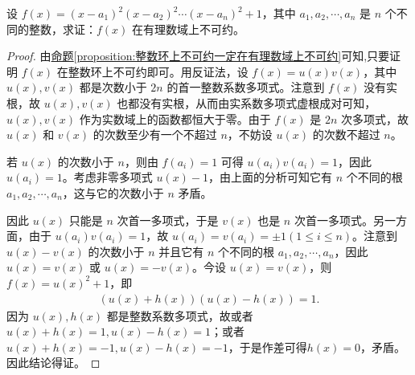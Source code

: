 \documentclass[../../main.tex]{subfiles}
\begin{document}
\begin{example}
设 $f(x) = (x - a_1)^2(x - a_2)^2 \cdots (x - a_n)^2 + 1$，其中 $a_1, a_2, \cdots, a_n$ 是 $n$ 个不同的整数，求证：$f(x)$ 在有理数域上不可约。
\end{example}
\begin{proof}
由\hyperref[proposition:整数环上不可约一定在有理数域上不可约]{命题\ref{proposition:整数环上不可约一定在有理数域上不可约}}可知,只要证明 $f(x)$ 在整数环上不可约即可。用反证法，设 $f(x) = u(x)v(x)$，其中 $u(x), v(x)$ 都是次数小于 $2n$ 的首一整数系数多项式。注意到 $f(x)$ 没有实根，故
$u(x), v(x)$
也都没有实根，从而由实系数多项式虚根成对可知，$u(x), v(x)$ 作为实数域上的函数都恒大于零。由于 $f(x)$ 是 $2n$ 次多项式，故 $u(x)$ 和 $v(x)$ 的次数至少有一个不超过 $n$，不妨设 $u(x)$ 的次数不超过 $n$。

若 $u(x)$ 的次数小于 $n$，则由 $f(a_i) = 1$ 可得 $u(a_i)v(a_i) = 1$，因此 $u(a_i) = 1$。考虑非零多项式 $u(x) - 1$，由上面的分析可知它有 $n$ 个不同的根 $a_1, a_2, \cdots, a_n$，这与它的次数小于 $n$ 矛盾。

因此 $u(x)$ 只能是 $n$ 次首一多项式，于是 $v(x)$ 也是 $n$ 次首一多项式。另一方面，由于 $u(a_i)v(a_i) = 1$，故 $u(a_i) = v(a_i) = \pm 1 (1 \leq i \leq n)$。注意到 $u(x) - v(x)$ 的次数小于 $n$ 并且它有 $n$ 个不同的根 $a_1, a_2, \cdots, a_n$，因此 $u(x) = v(x)$ 或 $u(x) = -v(x)$。今设 $u(x) = v(x)$，则 $f(x) = u(x)^2 + 1$，即
\begin{align*}
(u(x) + h(x))(u(x) - h(x)) = 1.
\end{align*}
因为 $u(x), h(x)$ 都是整数系数多项式，故或者 $u(x) + h(x) = 1, u(x) - h(x) = 1$；或者 $u(x) + h(x) = -1, u(x) - h(x) = -1$，于是作差可得$h(x) = 0$，矛盾。因此结论得证。
\end{proof}
\end{document}
